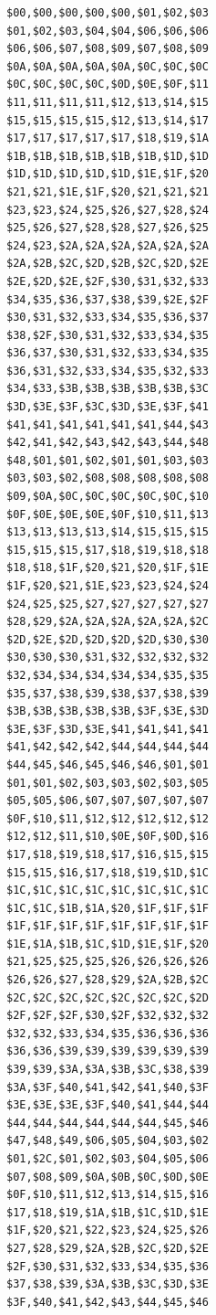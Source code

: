 \begin{minipage}[b]{0.31\linewidth}
\centering
\begin{lstlisting}[basicstyle=\ttfamily\tiny, caption=X Positions]
$00,$00,$00,$00,$00,$01,$02,$03
$01,$02,$03,$04,$04,$06,$06,$06
$06,$06,$07,$08,$09,$07,$08,$09
$0A,$0A,$0A,$0A,$0A,$0C,$0C,$0C
$0C,$0C,$0C,$0C,$0D,$0E,$0F,$11
$11,$11,$11,$11,$12,$13,$14,$15
$15,$15,$15,$15,$12,$13,$14,$17
$17,$17,$17,$17,$17,$18,$19,$1A
$1B,$1B,$1B,$1B,$1B,$1B,$1D,$1D
$1D,$1D,$1D,$1D,$1D,$1E,$1F,$20
$21,$21,$1E,$1F,$20,$21,$21,$21
$23,$23,$24,$25,$26,$27,$28,$24
$25,$26,$27,$28,$28,$27,$26,$25
$24,$23,$2A,$2A,$2A,$2A,$2A,$2A
$2A,$2B,$2C,$2D,$2B,$2C,$2D,$2E
$2E,$2D,$2E,$2F,$30,$31,$32,$33
$34,$35,$36,$37,$38,$39,$2E,$2F
$30,$31,$32,$33,$34,$35,$36,$37
$38,$2F,$30,$31,$32,$33,$34,$35
$36,$37,$30,$31,$32,$33,$34,$35
$36,$31,$32,$33,$34,$35,$32,$33
$34,$33,$3B,$3B,$3B,$3B,$3B,$3C
$3D,$3E,$3F,$3C,$3D,$3E,$3F,$41
$41,$41,$41,$41,$41,$41,$44,$43
$42,$41,$42,$43,$42,$43,$44,$48
$48,$01,$01,$02,$01,$01,$03,$03
$03,$03,$02,$08,$08,$08,$08,$08
$09,$0A,$0C,$0C,$0C,$0C,$0C,$10
$0F,$0E,$0E,$0E,$0F,$10,$11,$13
$13,$13,$13,$13,$14,$15,$15,$15
$15,$15,$15,$17,$18,$19,$18,$18
$18,$18,$1F,$20,$21,$20,$1F,$1E
$1F,$20,$21,$1E,$23,$23,$24,$24
$24,$25,$25,$27,$27,$27,$27,$27
$28,$29,$2A,$2A,$2A,$2A,$2A,$2C
$2D,$2E,$2D,$2D,$2D,$2D,$30,$30
$30,$30,$30,$31,$32,$32,$32,$32
$32,$34,$34,$34,$34,$34,$35,$35
$35,$37,$38,$39,$38,$37,$38,$39
$3B,$3B,$3B,$3B,$3B,$3F,$3E,$3D
$3E,$3F,$3D,$3E,$41,$41,$41,$41
$41,$42,$42,$42,$44,$44,$44,$44
$44,$45,$46,$45,$46,$46,$01,$01
$01,$01,$02,$03,$03,$02,$03,$05
$05,$05,$06,$07,$07,$07,$07,$07
$0F,$10,$11,$12,$12,$12,$12,$12
$12,$12,$11,$10,$0E,$0F,$0D,$16
$17,$18,$19,$18,$17,$16,$15,$15
$15,$15,$16,$17,$18,$19,$1D,$1C
$1C,$1C,$1C,$1C,$1C,$1C,$1C,$1C
$1C,$1C,$1B,$1A,$20,$1F,$1F,$1F
$1F,$1F,$1F,$1F,$1F,$1F,$1F,$1F
$1E,$1A,$1B,$1C,$1D,$1E,$1F,$20
$21,$25,$25,$25,$26,$26,$26,$26
$26,$26,$27,$28,$29,$2A,$2B,$2C
$2C,$2C,$2C,$2C,$2C,$2C,$2C,$2D
$2F,$2F,$2F,$30,$2F,$32,$32,$32
$32,$32,$33,$34,$35,$36,$36,$36
$36,$36,$39,$39,$39,$39,$39,$39
$39,$39,$3A,$3A,$3B,$3C,$38,$39
$3A,$3F,$40,$41,$42,$41,$40,$3F
$3E,$3E,$3E,$3F,$40,$41,$44,$44
$44,$44,$44,$44,$44,$44,$45,$46
$47,$48,$49,$06,$05,$04,$03,$02
$01,$2C,$01,$02,$03,$04,$05,$06
$07,$08,$09,$0A,$0B,$0C,$0D,$0E
$0F,$10,$11,$12,$13,$14,$15,$16
$17,$18,$19,$1A,$1B,$1C,$1D,$1E
$1F,$20,$21,$22,$23,$24,$25,$26
$27,$28,$29,$2A,$2B,$2C,$2D,$2E
$2F,$30,$31,$32,$33,$34,$35,$36
$37,$38,$39,$3A,$3B,$3C,$3D,$3E
$3F,$40,$41,$42,$43,$44,$45,$46
\end{lstlisting}
\end{minipage}
